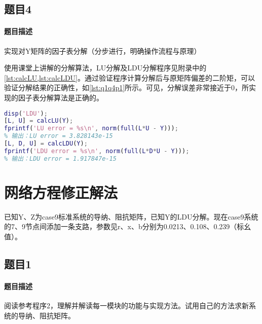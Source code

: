 \documentclass[a4paper,12pt]{article}
\begin{document}
    \subsection{题目4}
    \paragraph{题目描述} 实现对Y矩阵的因子表分解（分步进行，明确操作流程与原理）

    使用课堂上讲解的分解算法，LU分解及LDU分解程序见附录中的\cref{lst:calcLU,lst:calcLDU}。通过验证程序计算分解后与原矩阵偏差的二阶矩，可以验证分解结果的正确性，如\cref{lst:q1q4p1}所示。可见，分解误差非常接近于0，所实现的因子表分解算法是正确的。
    \begin{lstlisting}[language=matlab,label=lst:q1q4p1,caption={因子表分解及正确性验证}]
%% LDU
disp('LDU');
[L, U] = calcLU(Y);
fprintf('LU error = %s\n', norm(full(L*U - Y)));
% 输出：LU error = 3.828143e-15
[L, D, U] = calcLDU(Y);
fprintf('LDU error = %s\n', norm(full(L*D*U - Y)));
% 输出：LDU error = 1.917847e-15
    \end{lstlisting}
    \section{网络方程修正解法}
    已知Y、Z为case9标准系统的导纳、阻抗矩阵，已知Y的LDU分解。现在case9系统的7、9节点间添加一条支路，参数见r、x、b分别为0.0213、0.108、0.239（标幺值）。
    \subsection{题目1}
    \paragraph{题目描述} 阅读参考程序2，理解并解读每一模块的功能与实现方法。试用自己的方法求新系统的导纳、阻抗矩阵。
\end{document}
